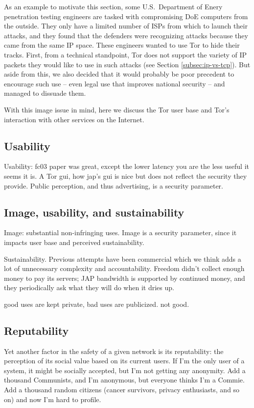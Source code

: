 \documentclass{llncs}
\begin{document}
As an example to motivate this section, some U.S.~Department of Enery
penetration testing engineers are tasked with compromising DoE computers
from the outside. They only have a limited number of ISPs from which to
launch their attacks, and they found that the defenders were recognizing
attacks because they came from the same IP space. These engineers wanted
to use Tor to hide their tracks. First, from a technical standpoint,
Tor does not support the variety of IP packets they would like to use in
such attacks (see Section \ref{subsec:ip-vs-tcp}). But aside from this,
we also decided that it would probably be poor precedent to encourage
such use -- even legal use that improves national security -- and managed
to dissuade them.

With this image issue in mind, here we discuss the Tor user base and
Tor's interaction with other services on the Internet.

\subsection{Usability}

Usability: fc03 paper was great, except the lower latency you are the
less useful it seems it is.
A Tor gui, how jap's gui is nice but does not reflect the security
they provide.
Public perception, and thus advertising, is a security parameter.


\subsection{Image, usability, and sustainability}

Image: substantial non-infringing uses. Image is a security parameter,
since it impacts user base and perceived sustainability.

Sustainability. Previous attempts have been commercial which we think
adds a lot of unnecessary complexity and accountability. Freedom didn't
collect enough money to pay its servers; JAP bandwidth is supported by
continued money, and they periodically ask what they will do when it
dries up.

good uses are kept private, bad uses are publicized. not good.

\subsection{Reputability}

Yet another factor in the safety of a given network is its reputability:
the perception of its social value based on its current users. If I'm
the only user of a system, it might be socially accepted, but I'm not
getting any anonymity. Add a thousand Communists, and I'm anonymous,
but everyone thinks I'm a Commie. Add a thousand random citizens (cancer
survivors, privacy enthusiasts, and so on) and now I'm hard to profile.
\end{document}
